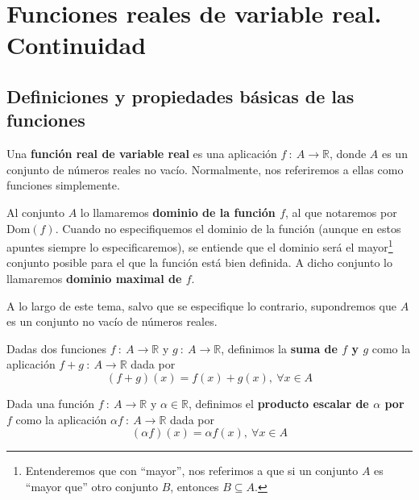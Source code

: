 \chapter{Funciones reales de variable real. Continuidad}


\section{Definiciones y propiedades básicas de las funciones}
\begin{definicion}
    Una \textbf{función real de variable real} es una aplicación $f ~:~ A \longrightarrow \mathbb{R}$, donde $A$ es un conjunto de números reales no vacío. Normalmente, nos referiremos a ellas como funciones simplemente.

    Al conjunto $A$ lo llamaremos \textbf{dominio de la función $f$}, al que notaremos por $\text{Dom}(f)$. Cuando no especifiquemos el dominio de la función (aunque en estos apuntes siempre lo especificaremos), se entiende que el dominio será el mayor\footnote{Entenderemos que con ``mayor'', nos referimos a que si un conjunto $A$ es ``mayor que'' otro conjunto $B$, entonces $B \subseteq A$.} conjunto posible para el que la función está bien definida. A dicho conjunto lo llamaremos \textbf{dominio maximal de $f$}.
\end{definicion}

A lo largo de este tema, salvo que se especifique lo contrario, supondremos que $A$ es
un conjunto no vacío de números reales.

\begin{definicion}
    Dadas dos funciones $f ~:~ A \longrightarrow \mathbb{R}$ y $g ~:~ A \longrightarrow \mathbb{R}$,
    definimos la \textbf{suma de $f$ y $g$} como la aplicación $f+g ~:~ A \longrightarrow \mathbb{R}$ dada por
    \begin{equation*}
        (f+g)(x) = f(x) + g(x), ~ \forall x \in A
    \end{equation*}
\end{definicion}

\begin{definicion}
    Dada una función $f ~:~ A \longrightarrow \mathbb{R}$ y $\alpha \in \mathbb{R}$, definimos el \textbf{producto escalar de $\alpha$ por $f$}
    como la aplicación $\alpha f ~:~ A \longrightarrow \mathbb{R}$ dada por
    \begin{equation*}
        (\alpha f)(x) = \alpha f(x), ~ \forall x \in A
    \end{equation*}
\end{definicion}

